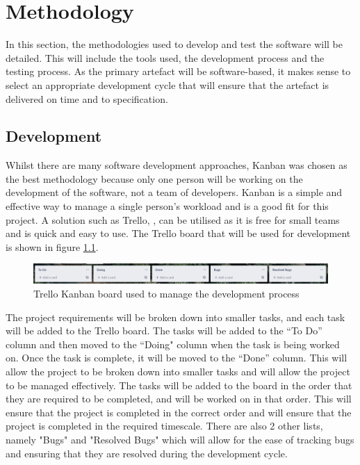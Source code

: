 \chapter{Methodology}
\label{chap:methodology}
In this section, the methodologies used to develop and test the software will be detailed. This will include the tools used, the development process and the testing process. As the primary artefact will be software-based, it makes sense to select an appropriate development cycle that will ensure that the artefact is delivered on time and to specification.
\section{Development}
\label{methodology:development}
Whilst there are many software development approaches, Kanban was chosen as the best methodology because only one person will be working on the development of the software, not a team of developers. Kanban is a simple and effective way to manage a single person’s workload and is a good fit for this project. A solution such as Trello, \citep{trello}, can be utilised as it is free for small teams and is quick and easy to use. The Trello board that will be used for development is shown in figure \ref{fig:kanban-board}.

\begin{figure}[H]
    \centering
    \includegraphics[scale=0.2]{images/trello-board.png}
    \caption{Trello Kanban board used to manage the development process}
    \label{fig:kanban-board}
\end{figure}

The project requirements will be broken down into smaller tasks, and each task will be added to the Trello board. The tasks will be added to the “To Do” column and then moved to the “Doing" column when the task is being worked on. Once the task is complete, it will be moved to the “Done” column. This will allow the project to be broken down into smaller tasks and will allow the project to be managed effectively. The tasks will be added to the board in the order that they are required to be completed, and will be worked on in that order. This will ensure that the project is completed in the correct order and will ensure that the project is completed in the required timescale.
There are also 2 other lists, namely "Bugs" and "Resolved Bugs" which will allow for the ease of tracking bugs and ensuring that they are resolved during the development cycle.

